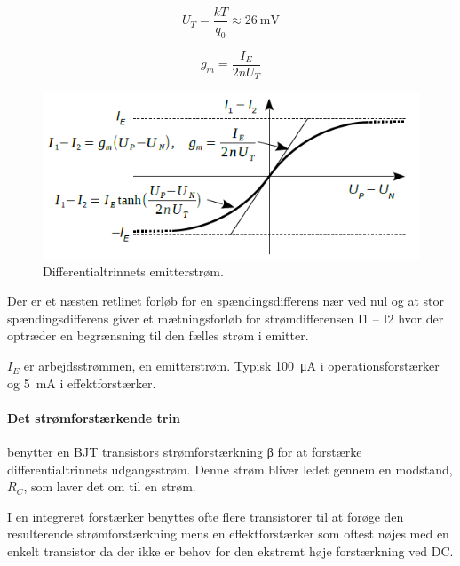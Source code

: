 \documentclass[danish]{article}
\begin{document}
\begin{equation} 
U_T = \frac{k T}{q_0} \approx \SI{26}{\milli\volt}
\end{equation}

\begin{equation} 
g_m = \frac{I_E}{2nU_T}
\end{equation}
	
\begin{figure} [H]
	\centering
	\includegraphics[width=0.8\linewidth]{graphics/differentialtrin_transkonduktans}
	\caption{Differentialtrinnets emitterstrøm.}
	\label{fig:differentialtrin_transkonduktans}
\end{figure}

Der er et næsten retlinet forløb for en spændingsdifferens nær ved nul og at stor spændingsdifferens giver et mætningsforløb for strømdifferensen I1 – I2 hvor der optræder en begrænsning til den fælles strøm i emitter. 

$I_E$ er arbejdsstrømmen, en emitterstrøm. Typisk \SI{100}{\micro\ampere} i operationsforstærker og \SI{5}{\milli\ampere} i effektforstærker.
\newpage 
\paragraph{Det strømforstærkende trin} benytter en BJT transistors strømforstærkning β for at forstærke differentialtrinnets udgangsstrøm. Denne strøm bliver ledet gennem en modstand, $R_C$, som laver det om til en strøm. 

I en integreret forstærker benyttes ofte flere transistorer til at forøge den resulterende strømforstærkning mens en effektforstærker som oftest nøjes med en enkelt transistor da der ikke er behov for den ekstremt høje forstærkning ved DC. 
\end{document}
